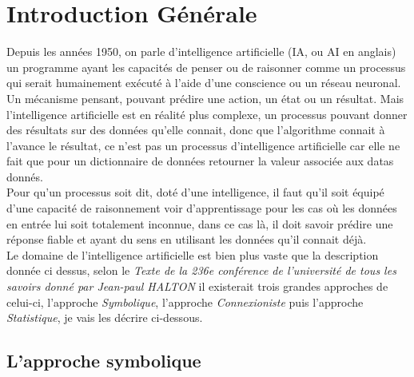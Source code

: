 \chapter{Introduction Générale}
\pagebreak

Depuis les années 1950, on parle d'intelligence artificielle (IA, ou AI en anglais) un programme ayant les capacités de penser ou de raisonner comme un processus qui serait humainement exécuté à l'aide d'une conscience ou un réseau neuronal. Un mécanisme pensant, pouvant prédire une action, un état ou un résultat. Mais l'intelligence artificielle est en réalité plus complexe, un processus pouvant donner des résultats sur des données qu'elle connait, donc que l'algorithme connait à l'avance le résultat, ce n'est pas un processus d'intelligence artificielle car elle ne fait que pour un dictionnaire de données retourner la valeur associée aux datas donnés. \\
Pour qu'un processus soit dit, doté d'une intelligence, il faut qu'il soit équipé d'une capacité de raisonnement voir d'apprentissage pour les cas où les données en entrée lui soit totalement inconnue, dans ce cas là, il doit savoir prédire une réponse fiable et ayant du sens en utilisant les données qu'il connait déjà.\\
\linebreak
Le domaine de l'intelligence artificielle est bien plus vaste que la description donnée ci dessus, selon le \textit{Texte de la 236e conférence de l'université de tous les savoirs donné par Jean-paul HALTON} il existerait trois grandes approches de celui-ci, l'approche \emph{Symbolique}, l'approche \emph{Connexioniste} puis l'approche \emph{Statistique}, je vais les décrire ci-dessous.

\pagebreak
\section{L'approche symbolique}

